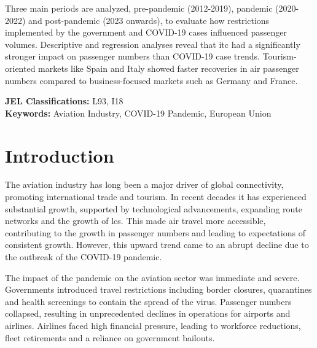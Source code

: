 \documentclass[12pt,onehalfspacing,headsepline,oneside,openright,a4paper, fleqn]{report}
\begin{document}
Three main periods are analyzed, pre-pandemic (2012-2019), pandemic (2020-2022) and post-pandemic (2023 onwards), to evaluate how restrictions implemented by the government and COVID-19 cases influenced passenger volumes. Descriptive and regression analyses reveal that \gls{itc} had a significantly stronger impact on passenger numbers than COVID-19 case trends. Tourism-oriented markets like Spain and Italy showed faster recoveries in air passenger numbers compared to business-focused markets such as Germany and France.


\vspace{5mm}
\noindent\textbf{JEL Classifications:} L93, I18 \\
\textbf{Keywords:} Aviation Industry, COVID-19 Pandemic, European Union




\tableofcontents

\listoffigures
{}

\listoftables
{}


\printglossary[type=\acronymtype]



\chapter{Introduction}

The aviation industry has long been a major driver of global connectivity, promoting international trade and tourism. In recent decades it has experienced substantial growth, supported by technological advancements, expanding route networks and the growth of \gls{lcs}. This made air travel more accessible, contributing to the growth in passenger numbers and leading to expectations of consistent growth. However, this upward trend came to an abrupt decline due to the outbreak of the COVID-19 pandemic. 

The impact of the pandemic on the aviation sector was immediate and severe. Governments introduced travel restrictions including border closures, quarantines and health screenings to contain the spread of the virus. Passenger numbers collapsed, resulting in unprecedented declines in operations for airports and airlines. Airlines faced high financial pressure, leading to workforce reductions, fleet retirements and a reliance on government bailouts.
\end{document}
